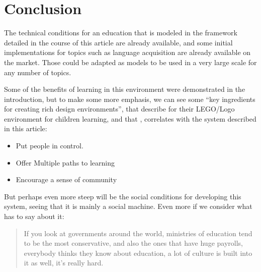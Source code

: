 \section{Conclusion}

The technical conditions for an education that is modeled in the framework detailed in the
course of this article are already available, and some initial implementations for
topics such as language acquisition are already available on the market.
\cite{education:anne_eisenberg_learning_native_speaker} Those could be
adapted as models to be used in a very large scale for any number of topics.

Some of the benefits of learning in this environment were demonstrated in the
introduction, but to make some more emphasis, we can see some ``key ingredients
for creating rich design environments'', that
\cite{education:resnick&ocko_learning_through_design} describe for their
LEGO/Logo environment for children learning, and that , correlates with the
system described in this article:

\begin{itemize}
    \item Put people in control.
    \item Offer Multiple paths to learning
    \item Encourage a sense of community
\end{itemize}

But perhaps even more steep will be the social conditions for developing this
system, seeing that it is mainly a social machine. Even more if we consider what
\cite{education:negroponte_speech_ted} has to say about it:

\begin{quote} 
    If you look at governments around the world, ministries of education tend to be
    the most conservative, and also the ones that have huge payrolls, everybody
    thinks they know about education, a lot of culture is built into it as well,
    it's really hard.
\end{quote} 


